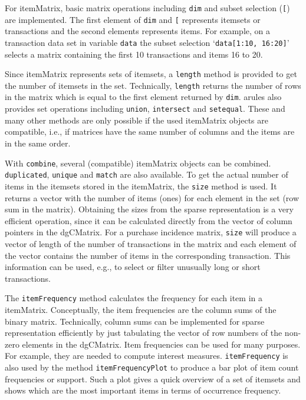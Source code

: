 \documentclass[10pt,a4paper]{article}
\newcommand{\strong}[1]{{\normalfont\fontseries{b}\selectfont #1}}
\newcommand{\class}[1]{\textsf{#1}}
\newcommand{\code}[1]{\texttt{#1}}
\newcommand{\pkg}[1]{\strong{#1}}
\newcommand{\samp}[1]{`\texttt{#1}'}
\begin{document}
For \class{itemMatrix}, basic matrix operations
including \code{dim} and subset
selection (\code{[}) are implemented.
The first element of \code{dim} and \code{[} represents itemsets or 
transactions and the second elements represents items. For example,
on a transaction data set in variable \code{data} the subset selection 
\samp{data[1:10, 16:20]} selects a matrix containing the 
first 10 transactions and items 16 to 20.

Since \class{itemMatrix} represents sets of itemsets,
a \code{length} method is provided to get the number of
itemsets in the set. Technically, \code{length} returns the number of
rows in the matrix which is equal to the first element returned by \code{dim}.
\pkg{arules} also provides set operations 
including \code{union}, \code{intersect}
and \code{setequal}. These and many other methods are only possible 
if the used \class{itemMatrix} objects 
are compatible, i.e., if matrices have the same number of 
columns and the items are in the same order.

With \code{combine}, several (compatible) \class{itemMatrix} objects
can be combined. \code{duplicated},
\code{unique} and \code{match} are also available.
To get the actual number of items in the itemsets stored in
the \class{itemMatrix}, the \code{size} method is used. 
It returns a vector with
the number of items (ones) for each element in the set 
(row sum in the matrix).  
Obtaining the sizes from the sparse representation is a very efficient 
operation, since it can be calculated directly from the vector of column
pointers in the \class{dgCMatrix}.
For a purchase incidence matrix, \code{size} will produce 
a vector of length of the
number of transactions in the matrix and each element of the vector
contains the number of items in the corresponding transaction.
This information can be used, e.g., 
to select or filter unusually long or short
transactions. 

The \code{itemFrequency} method calculates the frequency for each 
item in a \class{itemMatrix}. Conceptually, the item frequencies
are the column sums of the binary matrix. Technically, 
column sums can be implemented
for sparse representation efficiently by just
tabulating the vector of row numbers of the non-zero elements in
the \class{dgCMatrix}.
Item frequencies can be used for many purposes. 
For example, they are needed to compute interest measures.
\code{itemFrequency} is also used by the method \code{itemFrequencyPlot} 
to produce a bar plot of item count frequencies or support. 
Such a plot gives a quick overview of a set of itemsets 
and shows which are the most important 
items in terms of occurrence frequency.
\end{document}
